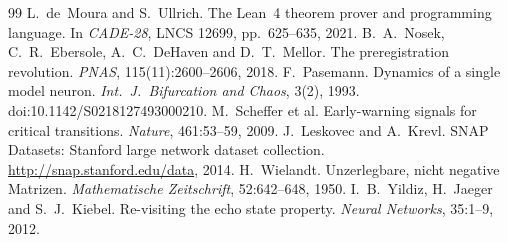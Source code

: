\documentclass[11pt]{article}
\theoremstyle{definition}
\theoremstyle{remark}
\begin{document}
\begin{thebibliography}{99}
 L.~de~Moura and S.~Ullrich. The Lean~4 theorem prover and programming language.
  In \emph{CADE-28}, LNCS 12699, pp.~625--635, 2021.
 B.~A.~Nosek, C.~R.~Ebersole, A.~C.~DeHaven and D.~T.~Mellor. The preregistration revolution.
  \emph{PNAS}, 115(11):2600--2606, 2018.
 F.~Pasemann. Dynamics of a single model neuron. \emph{Int.\ J.\ Bifurcation and Chaos},
  3(2), 1993. doi:10.1142/S0218127493000210.
 M.~Scheffer et al. Early-warning signals for critical transitions.
  \emph{Nature}, 461:53--59, 2009.
 J.~Leskovec and A.~Krevl. SNAP Datasets: Stanford large network dataset collection.
  \url{http://snap.stanford.edu/data}, 2014.
 H.~Wielandt. Unzerlegbare, nicht negative Matrizen.
  \emph{Mathematische Zeitschrift}, 52:642--648, 1950.
 I.~B.~Yildiz, H.~Jaeger and S.~J.~Kiebel. Re-visiting the echo state property.
  \emph{Neural Networks}, 35:1--9, 2012.
\end{thebibliography}
\end{document}
